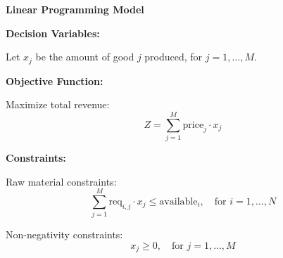 \documentclass{article}
\begin{document}
\textbf{Linear Programming Model}

\textbf{Decision Variables:}

Let \( x_j \) be the amount of good \( j \) produced, for \( j = 1, \ldots, M \).

\textbf{Objective Function:}

Maximize total revenue:
\[
Z = \sum_{j=1}^{M} \text{price}_j \cdot x_j
\]

\textbf{Constraints:}

Raw material constraints:
\[
\sum_{j=1}^{M} \text{req}_{i,j} \cdot x_j \leq \text{available}_{i}, \quad \text{for } i = 1, \ldots, N
\]

Non-negativity constraints:
\[
x_j \geq 0, \quad \text{for } j = 1, \ldots, M
\]
\end{document}
